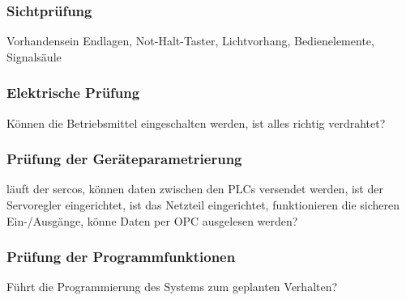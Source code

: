 \documentclass[../../../Bachelorarbeit.tex]{subfiles}
\begin{document}
\subsubsection{Sichtprüfung}
Vorhandensein Endlagen, Not-Halt-Taster, Lichtvorhang, Bedienelemente, Signalsäule

\subsubsection{Elektrische Prüfung}
Können die Betriebsmittel eingeschalten werden, ist alles richtig verdrahtet?

\subsubsection{Prüfung der Geräteparametrierung}
läuft der sercos, können daten zwischen den PLCs versendet werden, ist der Servoregler eingerichtet, ist das Netzteil eingerichtet, funktionieren die sicheren Ein-/Ausgänge, könne Daten per OPC ausgelesen werden?

\subsubsection{Prüfung der Programmfunktionen}
Führt die Programmierung des Systems zum geplanten Verhalten? 
\end{document}
